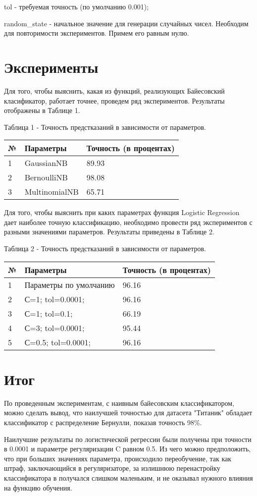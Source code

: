 \documentclass[a4paper,12pt]{article}
\begin{document}
	\vspace{0.5cm}
	tol - требуемая точность (по умолчанию 0.001);
	
	\vspace{0.5cm}
	random\_state - начальное значение для генерации случайных чисел. Необходим для повторимости экспериментов. Примем его равным нулю.


	
\newpage\section{Эксперименты}
	Для того, чтобы выяснить, какая из функций, реализующих Байесовский класификатор, работает точнее, проведем ряд экспериментов. Результаты отображены в Таблице 1.
	
	\vspace{0.5cm}
	Таблица 1 - Точность предстказаний в зависимости от параметров.
\begin{longtable}{|p{1cm}|p{9cm}|p{3cm}|}
\hline 
№ & Параметры & Точность (в процентах) \\ 
\hline 
1 & GaussianNB & 89.93 \\
\hline
2 & BernoulliNB & 98.08 \\
\hline 
3 & MultinomialNB & 65.71 \\
\hline
\end{longtable}	
	
	Для того, чтобы выяснить при каких параметрах функция Logistic Regression дает наиболее точную классификацию, необходимо провести ряд экспериментов с разными значениями параметров. Результаты приведены в Таблице 2.
	
	\vspace{0.5cm}
	Таблица 2 - Точность предстказаний в зависимости от параметров.
\begin{longtable}{|p{1cm}|p{9cm}|p{3cm}|}
\hline 
№ & Параметры & Точность (в процентах) \\ 
\hline 
1 & Параметры по умолчанию & 96.16 \\
\hline
2 & С=1; tol=0.0001; & 96.16 \\
\hline 
3 & С=1; tol=0.1; & 66.19 \\
\hline 
4 & С=3; tol=0.0001;  & 95.44 \\
\hline 
5 & С=0.5; tol=0.0001;  & 96.16 \\
\hline 
\end{longtable}


\newpage\section{Итог}
	По проведенным экспериментам, с наивным байесовским классификатором, можно сделать вывод, что наилучшей точностью для датасета "Титаник" обладает классификатор с распределение Бернулли, показав точность 98\%.
	
	\vspace{0.5cm}
	Наилучшие результаты по логистической регрессии были получены при точности в 0.0001 и параметре регуляризации C равном 0.5. Из чего можно предположить, что при больших значениях параметра, происходило переобучение, так как штраф, заключающийся в регуляризаторе, за излишнюю перенастройку классификатора в получался слишком маленьким, и не оказывал нужного влияния на функцию обучения.
	
\end{document}
